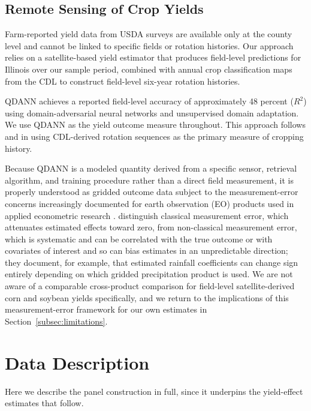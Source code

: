 \documentclass[12pt,letterpaper]{article}
\theoremstyle{remark}
\theoremstyle{remark}
\theoremstyle{plain}
\theoremstyle{definition}
\begin{document}
\subsection{\label{subsec:remote_sensing}Remote Sensing of Crop Yields}

Farm-reported yield data from USDA surveys are available only at the county level and cannot be linked to specific fields or rotation histories. Our approach relies on a satellite-based yield estimator that produces field-level predictions for Illinois over our sample period, combined with annual crop classification maps from the CDL to construct field-level six-year rotation histories.

QDANN \citep{Ma2024} achieves a reported field-level accuracy of approximately 48 percent ($R^2$) using domain-adversarial neural networks and unsupervised domain adaptation. We use QDANN as the yield outcome measure throughout. This approach follows \citet{Pates2025} and \citet{socolar2021} in using CDL-derived rotation sequences as the primary measure of cropping history.

Because QDANN is a modeled quantity derived from a specific sensor, retrieval algorithm, and training procedure rather than a direct field measurement, it is properly understood as gridded outcome data subject to the measurement-error concerns increasingly documented for earth observation (EO) products used in applied econometric research \citep{Benami2026}. \citet{Benami2026} distinguish classical measurement error, which attenuates estimated effects toward zero, from non-classical measurement error, which is systematic and can be correlated with the true outcome or with covariates of interest and so can bias estimates in an unpredictable direction; they document, for example, that estimated rainfall coefficients can change sign entirely depending on which gridded precipitation product is used. We are not aware of a comparable cross-product comparison for field-level satellite-derived corn and soybean yields specifically, and we return to the implications of this measurement-error framework for our own estimates in Section~\ref{subsec:limitations}.

\section{\label{sec:data}Data Description}

Here we describe the panel construction in full, since it underpins the yield-effect estimates that follow.
\end{document}
